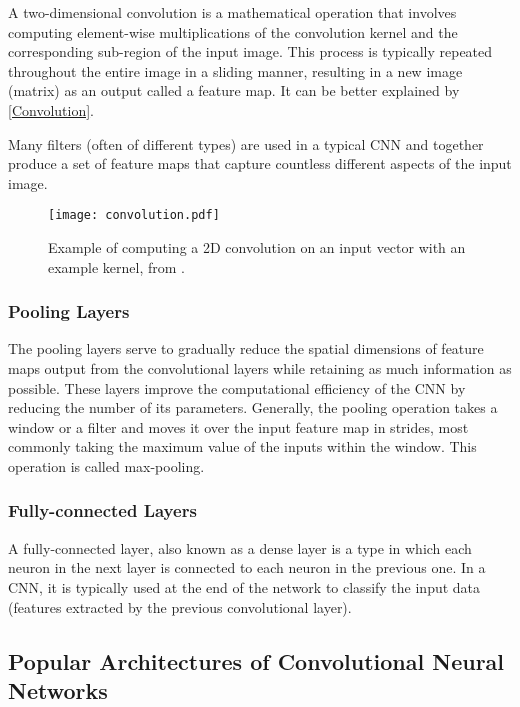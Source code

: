 A two-dimensional convolution is a mathematical operation that involves
computing element-wise multiplications of the convolution kernel and the
corresponding sub-region of the input image. This process is typically repeated
throughout the entire image in a sliding manner, resulting in a new image
(matrix) as an output called a feature map. It can be better explained by
\autoref{Convolution}.

Many filters (often of different types) are used in a typical CNN and together
produce a set of feature maps that capture countless different aspects of the
input image.

\begin{figure}[h]
    \centering
    \texttt{[image: convolution.pdf]}
    \caption{Example of computing a 2D convolution on an input vector with an example kernel, from \cite{OShea2015}.}
    \label{Convolution}
\end{figure}


\subsubsection{Pooling Layers}

The pooling layers serve to gradually reduce the spatial dimensions of feature
maps output from the convolutional layers while retaining as much information as
possible. These layers improve the computational efficiency of the CNN by
reducing the number of its parameters. Generally, the pooling operation takes a
window or a filter and moves it over the input feature map in strides, most
commonly taking the maximum value of the inputs within the window. This
operation is called max-pooling. \cite{OShea2015}


\subsubsection{Fully-connected Layers}

A fully-connected layer, also known as a dense layer is a type in which each
neuron in the next layer is connected to each neuron in the previous one. In a
CNN, it is typically used at the end of the network to classify the input data
(features extracted by the previous convolutional layer). \cite{OShea2015}


\subsection{Popular Architectures of Convolutional Neural Networks}

